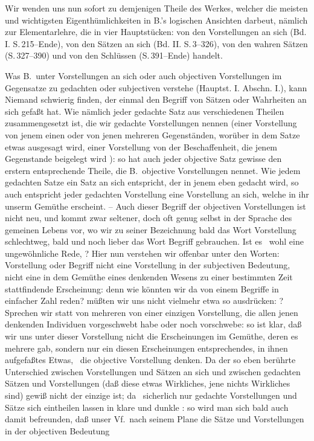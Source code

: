 \gliederungslinie\par
Wir wenden uns nun sofort zu demjenigen Theile des Werkes, welcher die meisten und wichtigsten Eigenthümlichkeiten in B.'s logischen Ansichten darbeut, nämlich zur Elementarlehre, die in vier Hauptstücken: von den Vorstellungen an sich (Bd. I. S.\,215--Ende), von den Sätzen an sich (Bd. II. S.\,3--326), von den wahren Sätzen (S.\,327--390) und von den Schlüssen (S.\,391--Ende) handelt. \par
Was B.\ unter Vorstellungen an sich oder auch objectiven Vorstellungen im Gegensatze zu gedachten oder subjectiven verstehe (Hauptst. I. Abschn. I.), kann Niemand schwierig finden, der einmal den Begriff von Sätzen oder Wahrheiten an sich gefaßt hat. Wie nämlich jeder gedachte Satz aus verschiedenen Theilen zusammengesetzt ist, die wir gedachte Vorstellungen nennen (einer Vorstellung von jenem einen oder von jenen mehreren Gegenständen, worüber in dem Satze etwas ausgesagt wird, einer Vorstellung von der Beschaffenheit, die jenem Gegenstande beigelegt wird \udgl ): so hat auch jeder objective Satz gewisse den erstern entsprechende Theile, die B.\ objective Vorstellungen nennet. Wie jedem gedachten Satze ein Satz an sich entspricht, der in jenem eben gedacht wird, so auch entspricht jeder gedachten Vorstellung eine Vorstellung an sich, welche in ihr unserm Gemüthe erscheint. -- Auch dieser Begriff der objectiven Vorstellungen ist nicht neu, und kommt zwar seltener, doch oft genug selbst in der Sprache des gemeinen Lebens vor, wo wir zu seiner Bezeichnung bald das Wort Vorstellung schlechtweg, bald und noch lieber das Wort Begriff gebrauchen. Ist es \zB\ wohl eine ungewöhnliche Rede, ? Hier nun verstehen wir offenbar unter den Worten: Vorstellung oder  Begriff nicht eine Vorstellung in der subjectiven Bedeutung, nicht eine in dem Gemüthe eines denkenden Wesens zu einer bestimmten Zeit stattfindende Erscheinung: denn wie könnten wir da von einem Begriffe in einfacher Zahl reden? müßten wir uns nicht vielmehr etwa so ausdrücken: ? Sprechen wir statt von mehreren von einer einzigen Vorstellung, die allen jenen denkenden Individuen vorgeschwebt habe oder noch vorschwebe: so ist klar, daß wir uns unter dieser Vorstellung nicht die Erscheinungen im Gemüthe, deren es mehrere gab, sondern nur ein diesen Erscheinungen entsprechendes, in ihnen aufgefaßtes Etwas, \dh\  die objective Vorstellung denken. Da der so eben berührte Unterschied zwischen Vorstellungen und Sätzen an sich und zwischen gedachten Sätzen und Vorstellungen (daß diese etwas Wirkliches, jene nichts Wirkliches sind) gewiß nicht der einzige ist; da \zB\ sicherlich nur gedachte Vorstellungen und Sätze sich eintheilen lassen in klare und dunkle \usw : so wird man sich bald auch damit befreunden, daß unser Vf.\ nach seinem Plane die Sätze und Vorstellungen in der objectiven Bedeutung 